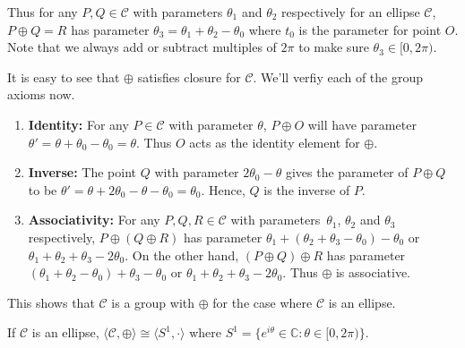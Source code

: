 Thus for any $P,Q \in \mathcal{C}$ with parameters $\theta_1$ and $\theta_2$ respectively
for an ellipse $\mathcal{C}$, $P \oplus Q = R$ has parameter
$\theta_3 = \theta_1 + \theta_2 - \theta_0$ where $t_0$ is the parameter for point
$O$. Note that we always add or subtract multiples of $2\pi$ to make sure
$\theta_3 \in [0,2\pi)$.
\vspace{1ex}

It is easy to see that $\oplus$ satisfies closure for $\mathcal{C}$. We'll verfiy each of 
the group axioms now.

\begin{enumerate}
    \item{\textbf{Identity:}} For any $P \in \mathcal{C}$ with parameter $\theta$,
        $P \oplus O$ will have parameter
        $\theta' = \theta + \theta_0 - \theta_0 = \theta$. Thus $O$ acts as the
        identity element for $\oplus$.

    \item{\textbf{Inverse:}} The point $Q$ with parameter $2\theta_0 - \theta$
        gives the parameter of $P \oplus Q$ to be
        $\theta' = \theta + 2\theta_0 - \theta - \theta_0=\theta_0$. Hence, $Q$
        is the inverse of $P$.

    \item{\textbf{Associativity:}} For any $P,Q,R \in \mathcal{C}$ with parameters\
        $\theta_1$, $\theta_2$ and $\theta_3$ respectively, $P\oplus(Q \oplus R)$
        has parameter $\theta_1 + (\theta_2 + \theta_3 - \theta_0) - \theta_0$ or
        $\theta_1 + \theta_2 + \theta_3 - 2\theta_0$. On the other hand,
        $(P \oplus Q)\oplus R$ has parameter
        $(\theta_1 + \theta_2 - \theta_0) + \theta_3 - \theta_0$ or
        $\theta_1 + \theta_2 + \theta_3 - 2\theta_0$. Thus $\oplus$ is
        associative.
\end{enumerate}

\noindent
This shows that $\mathcal{C}$ is a group with $\oplus$ for the case where $\mathcal{C}$ is an ellipse.

\begin{theorem}
    If $\mathcal{C}$ is an ellipse,
    $\langle \mathcal{C},\oplus \rangle \cong \langle S^1,\cdot \rangle$ where
    $S^1=\{e^{i\theta}\in\mathbb{C}: \theta \in [0,2\pi)\}$.
\end{theorem}

